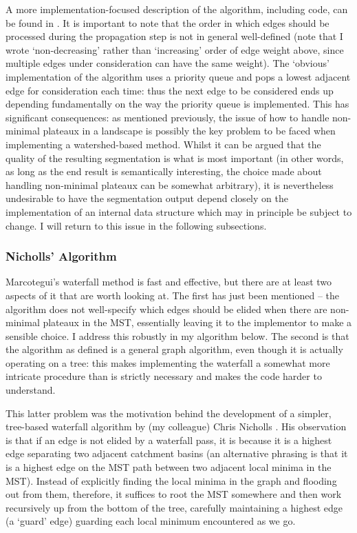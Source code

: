 A more implementation-focused description of the algorithm, including code, can be found in \cite{golodetz08}. It is important to note that the order in which edges should be processed during the propagation step is not in general well-defined (note that I wrote `non-decreasing' rather than `increasing' order of edge weight above, since multiple edges under consideration can have the same weight). The `obvious' implementation of the algorithm uses a priority queue and pops a lowest adjacent edge for consideration each time: thus the next edge to be considered ends up depending fundamentally on the way the priority queue is implemented. This has significant consequences: as mentioned previously, the issue of how to handle non-minimal plateaux in a landscape is possibly the key problem to be faced when implementing a watershed-based method. Whilst it can be argued that the quality of the resulting segmentation is what is most important (in other words, as long as the end result is semantically interesting, the choice made about handling non-minimal plateaux can be somewhat arbitrary), it is nevertheless undesirable to have the segmentation output depend closely on the implementation of an internal data structure which may in principle be subject to change. I will return to this issue in the following subsections.

\subsubsection{Nicholls' Algorithm}

Marcotegui's waterfall method is fast and effective, but there are at least two aspects of it that are worth looking at. The first has just been mentioned -- the algorithm does not well-specify which edges should be elided when there are non-minimal plateaux in the MST, essentially leaving it to the implementor to make a sensible choice. I address this robustly in my algorithm below. The second is that the algorithm as defined is a general graph algorithm, even though it is actually operating on a tree: this makes implementing the waterfall a somewhat more intricate procedure than is strictly necessary and makes the code harder to understand.

This latter problem was the motivation behind the development of a simpler, tree-based waterfall algorithm by (my colleague) Chris Nicholls \cite{nicholls09}. His observation is that if an edge is not elided by a waterfall pass, it is because it is a highest edge separating two adjacent catchment basins (an alternative phrasing is that it is a highest edge on the MST path between two adjacent local minima in the MST). Instead of explicitly finding the local minima in the graph and flooding out from them, therefore, it suffices to root the MST somewhere and then work recursively up from the bottom of the tree, carefully maintaining a highest edge (a `guard' edge) guarding each local minimum encountered as we go.

